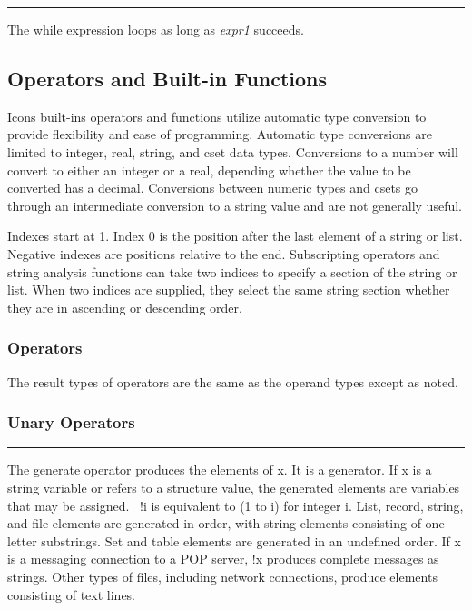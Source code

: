 \bigskip\hrule\vspace{0.1cm}

\noindent
{}The \textsf{while} expression loops as long as
\textit{expr1} succeeds.

\subsection{Operators and Built-in Functions}

Icon{\textquotesingle}s built-ins operators and functions utilize
automatic type conversion to provide flexibility and ease of
programming. Automatic type conversions are limited to integer, real, string, and cset data
types. Conversions to a {\textquotedbl}number{\textquotedbl} will
convert to either an integer or a real, depending whether the value to
be converted has a decimal. Conversions between numeric types and csets
go through an intermediate conversion to a string value and are not
generally useful.

Indexes start at 1. Index 0 is the position after the last element of a
string or list. Negative indexes are positions
relative to the end. Subscripting operators and string analysis
functions can take two indices to specify a section of the string or
list. When two indices are supplied, they select the same string
section whether they are in ascending or descending order.

\subsubsection[Operators]{Operators}
The result types of operators are the same as the
operand types except as noted.

\subsubsection{Unary Operators}

\bigskip\hrule\vspace{0.1cm}

\noindent
{}The generate
operator produces the elements of \textsf{x}. It is a generator. If
\textsf{x} is a string variable or refers to a structure value, the
generated elements are variables that may be assigned. \ \textsf{!i} is
equivalent to \textsf{(1 to i)} for integer \textsf{i}. List, record,
string, and file elements are generated in order, with string elements
consisting of one-letter substrings. Set and table elements are
generated in an undefined order. If \textsf{x} is a messaging
connection to a POP server, \textsf{!x} produces complete messages as
strings. Other types of files, including network connections, produce
elements consisting of text lines.

